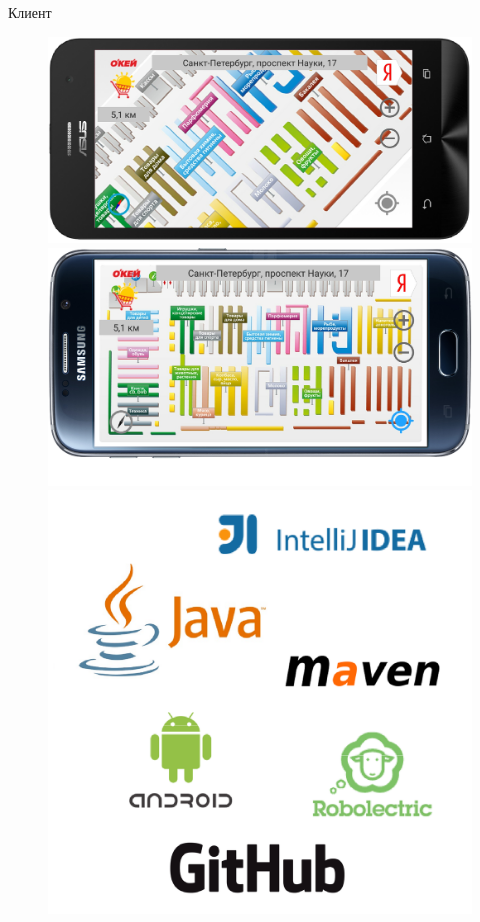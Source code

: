 \documentclass[11pt,slides,aspectratio=43]{beamer}%
\begin{document}
    \begin{frame}{Клиент}

        \begin{figure}[t!]
              \center\includegraphics[width = \linewidth]{screenFirstAsus.png}
              \center\includegraphics[width = \linewidth]{screenSecondSamsung.png}
            \endminipage\hfill
              \center\includegraphics[width = \linewidth]{logosClient.png} %
            \endminipage\hfill
        \end{figure}
    \end{frame}
\end{document}

